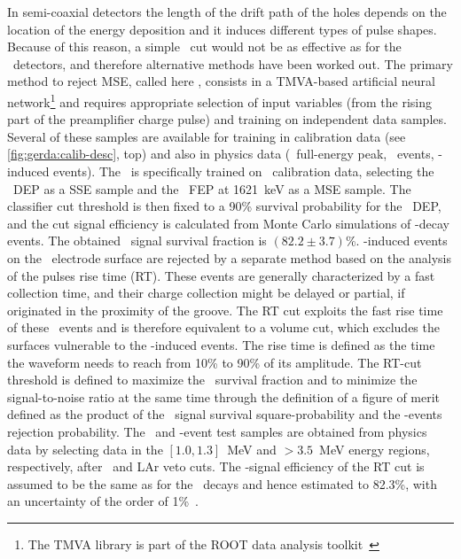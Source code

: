 In semi-coaxial detectors the length of the drift path of the holes depends on the
location of the energy deposition and it induces different types of pulse shapes. Because
of this reason, a simple \aoe\ cut would not be as effective as for the \bege\ detectors, and
therefore alternative methods have been worked out.
\newpar
The primary method to reject MSE, called here \annmse, consists in a TMVA-based artificial
neural network\footnote{The TMVA library is part of the ROOT data analysis
toolkit~\cite{Brun1997}} and requires appropriate selection of input variables (from the
rising part of the preamplifier charge pulse) and training on independent data samples.
Several of these samples are available for training in calibration data (see
\cref{fig:gerda:calib-desc}, top) and also in physics data (\kvz\ full-energy peak, \nnbb\
events, \a-induced events). The \annmse\ is specifically trained on \Th\ calibration data,
selecting the \Tl\ DEP as a SSE sample and the \Bil\ FEP at 1621~keV as a MSE sample. The
classifier cut threshold is then fixed to a 90\% survival probability for the \Th\ DEP,
and the cut signal efficiency is calculated from Monte Carlo simulations of \onbb-decay
events. The obtained \annmse\ signal survival fraction is $(82.2 \pm 3.7)$\%.
\newpar
\a-induced events on the \pplus\ electrode surface are rejected by a separate method based
on the analysis of the pulses rise time (RT). These events are generally characterized by
a fast collection time, and their charge collection might be delayed or partial, if
originated in the proximity of the groove. The RT cut exploits the fast rise time of these
\a\ events and is therefore equivalent to a volume cut, which excludes the surfaces
vulnerable to the \a-induced events. The rise time is defined as the time the waveform
needs to reach from 10\% to 90\% of its amplitude. The RT-cut threshold is defined to
maximize the \onbb\ survival fraction and to minimize the signal-to-noise ratio at the
same time through the definition of a figure of merit defined as the product of the \nnbb\
signal survival square-probability and the \a-events rejection probability. The \nnbb\ and
\a-event test samples are obtained from physics data by selecting data in the $[1.0,
1.3]$~MeV and $>3.5$~MeV energy regions, respectively, after \annmse\ and LAr veto cuts.
The \onbb-signal efficiency of the RT cut is assumed to be the same as for the \nnbb\
decays and hence estimated to 82.3\%, with an uncertainty of the order of
1\%~\cite{Lazzaro2019}.

